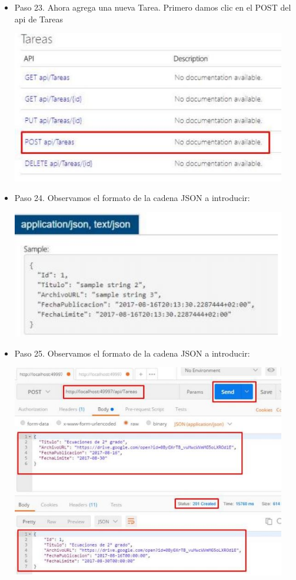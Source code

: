 \begin{flushleft}
\begin{itemize}
\item Paso 23. Ahora agrega una nueva Tarea. Primero damos clic en el POST del api de Tareas
\begin{center}
	\includegraphics[width=12cm]{./Imagenes/paso23} 
	\end{center}


\item Paso 24. Observamos el formato de la cadena JSON a introducir: 
\begin{center}
	\includegraphics[width=12cm]{./Imagenes/paso24} 
	\end{center}

\item Paso 25. Observamos el formato de la cadena JSON a introducir: 
\begin{center}
	\includegraphics[width=12cm]{./Imagenes/paso25} 
	\end{center}


\end{itemize}
\end{flushleft}
